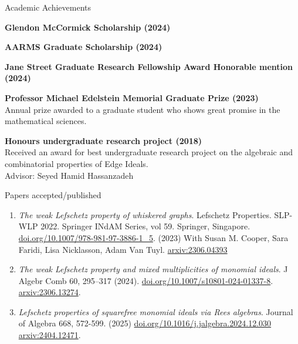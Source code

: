 \documentclass[12pt]{resume} %
\begin{document}


\begin{rSection}{Academic Achievements}

{\bf Glendon McCormick Scholarship (2024)}

{\bf AARMS Graduate Scholarship (2024)}

{\bf Jane Street Graduate Research Fellowship Award Honorable mention (2024)}

{\bf Professor Michael Edelstein Memorial Graduate Prize (2023)}
\\
Annual prize awarded to a graduate student who shows great promise in the mathematical sciences. 


{\bf Honours undergraduate research project (2018)}
\\
Received an award for best undergraduate research project on the algebraic and combinatorial properties of Edge Ideals.
\\
Advisor: Seyed Hamid Hassanzadeh
\end{rSection}

\begin{rSection}{Papers accepted/published}
    \begin{enumerate}
        \item \textit{The weak Lefschetz property of whiskered graphs}.  Lefschetz Properties. SLP-WLP 2022. Springer INdAM Series, vol 59. Springer, Singapore. \href{https://doi.org/10.1007/978-981-97-3886-1_5}{doi.org/10.1007/978-981-97-3886-1\_5}. (2023) With Susan M. Cooper, Sara Faridi, Lisa Nicklasson, Adam Van Tuyl.  \href{https://arxiv.org/abs/2306.04393}{arxiv:2306.04393}
        \item \textit{The weak Lefschetz property and mixed multiplicities of monomial ideals}. J Algebr Comb 60, 295–317 (2024). \href{https://doi.org/10.1007/s10801-024-01337-8}{doi.org/10.1007/s10801-024-01337-8}. \href{https://arxiv.org/abs/2306.13274}{arxiv:2306.13274}.
        \item \textit{Lefschetz properties of squarefree monomial ideals via Rees algebras}. Journal of Algebra 668, 572-599. (2025) \href{https://doi.org/10.1016/j.jalgebra.2024.12.030}{doi.org/10.1016/j.jalgebra.2024.12.030} \href{https://arxiv.org/abs/2404.12471}{arxiv:2404.12471}. 
    \end{enumerate}
\end{rSection}
\end{document}

